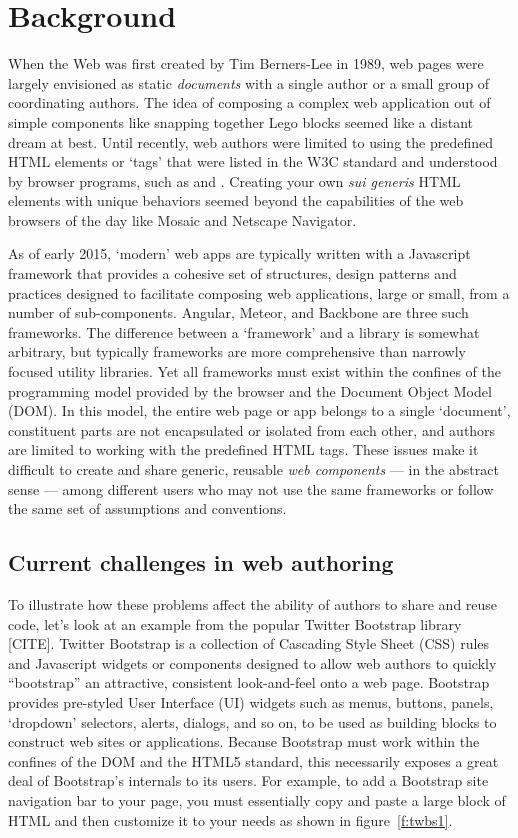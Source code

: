 \chapter{Background}
%

When the Web was first created by Tim Berners-Lee in 1989, web pages were largely envisioned as static \textit{documents} with a single author or a small group of coordinating authors. 
The idea of composing a complex web application out of simple components like snapping together Lego blocks seemed like a distant dream at best.
Until recently, web authors were limited to using the predefined HTML elements or `tags' that were listed in the W3C standard and understood by browser programs, such as  and . 
Creating your own \textit{sui generis} HTML elements with unique behaviors seemed beyond the capabilities of the web browsers of the day like Mosaic and Netscape Navigator.

As of early 2015, `modern' web apps are typically written with a Javascript framework that provides a cohesive set of structures, design patterns and practices designed to facilitate composing web applications, large or small, from a number of sub-components.
Angular, Meteor, and Backbone are three such frameworks.
The difference between a `framework' and a library is somewhat arbitrary, but typically frameworks are more comprehensive than narrowly focused utility libraries.
Yet all frameworks must exist within the confines of the programming model provided by the browser and the Document Object Model (DOM). 
In this model, the entire web page or app belongs to a single `document', constituent parts are not encapsulated or isolated from each other, and authors are limited to working with the predefined HTML tags.
These issues make it difficult to create and share generic, reusable \textit{web components} 
--- in the abstract sense --- 
among different users who may not use the same frameworks or follow the same set of assumptions and conventions.

\section{Current challenges in web authoring}
To illustrate how these problems affect the ability of authors to share and reuse code, let's look at an example from the popular Twitter Bootstrap library [CITE].
Twitter Bootstrap is a collection of Cascading Style Sheet (CSS) rules and Javascript widgets or components designed to allow web authors to quickly ``bootstrap'' an attractive, consistent look-and-feel onto a web page.
Bootstrap provides pre-styled User Interface (UI) widgets such as menus, buttons, panels, `dropdown' selectors, alerts, dialogs, and so on, to be used as building blocks to construct web sites or applications.
Because Bootstrap must work within the confines of the DOM and the HTML5 standard, this necessarily exposes a great deal of Bootstrap's internals to its users.
For example, to add a Bootstrap site navigation bar to your page, you must essentially copy and paste a large block of HTML and then customize it to your needs as shown in figure~\ref{f:twbs1}.

